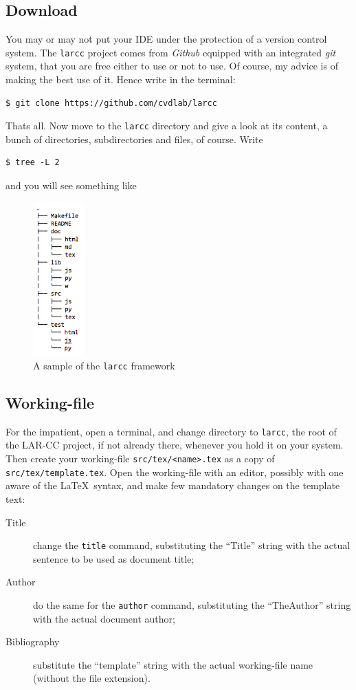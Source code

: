 \subsection{Download}

You may or may not put your IDE under the protection of a version control system. The \texttt{larcc} project comes from \emph{Github} equipped with an integrated \emph{git} system, that you are free either to use or not to use. Of course, my advice  is of making the best use of it. Hence write in the terminal:
\begin{verbatim}
$ git clone https://github.com/cvdlab/larcc
\end{verbatim}

Thats all. Now move to the \texttt{larcc} directory and give a look at its content, a bunch of directories, subdirectories and files, of course. Write
\begin{verbatim}
$ tree -L 2
\end{verbatim}
and you will see something like
\begin{figure}[htbp] %
   \centering
   \includegraphics[width=2cm]{images/tree.png} 
   \caption{A sample of the \texttt{larcc} framework}
   \label{fig:tree}
\end{figure}

\subsection{Working-file}
For the impatient, open a terminal, and change directory to \texttt{larcc}, the root of the LAR-CC project, if not already there, whenever you hold it on your system. Then create your working-file \texttt{src/tex/<name>.tex} as a copy of \texttt{src/tex/template.tex}. Open the working-file with an editor, possibly with one aware of the \LaTeX\ syntax, and make few mandatory changes on the template text: 

\begin{description}
\item[Title] change the \texttt{title} command, substituting the ``Title'' string with the actual sentence to be used as document title;
\item[Author]  do the same for the \texttt{author} command, substituting the ``TheAuthor'' string with the actual document author;

\item[Bibliography] substitute the ``template'' string with the actual working-file name (without the file extension).
\end{description}

